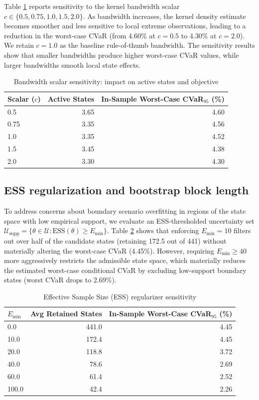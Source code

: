 \documentclass[smallextended]{svjour3}
\begin{document}
Table \ref{tab:sens_bw} reports sensitivity to the kernel bandwidth scalar $c \in \{0.5, 0.75, 1.0, 1.5, 2.0\}$. As bandwidth increases, the kernel density estimate becomes smoother and less sensitive to local extreme observations, leading to a reduction in the worst-case CVaR (from 4.60\% at $c=0.5$ to 4.30\% at $c=2.0$). We retain $c=1.0$ as the baseline rule-of-thumb bandwidth. The sensitivity results show that smaller bandwidths produce higher worst-case CVaR values, while larger bandwidths smooth local state effects.

\begin{table}[htbp]
\centering
\caption{Bandwidth scalar sensitivity: impact on active states and objective}
\label{tab:sens_bw}
\begin{tabular}{lrr}
\toprule
\textbf{Scalar ($c$)} & \textbf{Active States} & \textbf{In-Sample Worst-Case CVaR$_{95}$ (\%)} \\
\midrule
0.5 & 3.65 & 4.60 \\
0.75 & 3.35 & 4.56 \\
1.0 & 3.35 & 4.52 \\
1.5 & 3.45 & 4.38 \\
2.0 & 3.30 & 4.30 \\
\bottomrule
\end{tabular}
\end{table}

\subsection{ESS regularization and bootstrap block length}
To address concerns about boundary scenario overfitting in regions of the state space with low empirical support, we evaluate an ESS-thresholded uncertainty set $\mathcal{U}_{\text{supp}} = \{\theta \in \mathcal{U} : \text{ESS}(\theta) \ge E_{\min}\}$. Table \ref{tab:sens_ess} shows that enforcing $E_{\min} = 10$ filters out over half of the candidate states (retaining 172.5 out of 441) without materially altering the worst-case CVaR (4.45\%). However, requiring $E_{\min} \ge 40$ more aggressively restricts the admissible state space, which materially reduces the estimated worst-case conditional CVaR by excluding low-support boundary states (worst CVaR drops to 2.69\%).

\begin{table}[htbp]
\centering
\caption{Effective Sample Size (ESS) regularizer sensitivity}
\label{tab:sens_ess}
\begin{tabular}{lrr}
\toprule
$E_{\min}$ & \textbf{Avg Retained States} & \textbf{In-Sample Worst-Case CVaR$_{95}$ (\%)} \\
\midrule
0.0 & 441.0 & 4.45 \\
10.0 & 172.4 & 4.45 \\
20.0 & 118.8 & 3.72 \\
40.0 & 78.6 & 2.69 \\
60.0 & 61.4 & 2.52 \\
100.0 & 42.4 & 2.26 \\
\bottomrule
\end{tabular}
\end{table}
\end{document}
